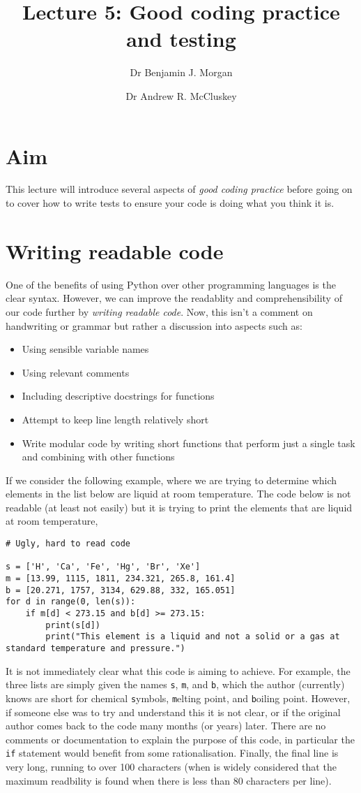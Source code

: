 \documentclass[a4paper]{article}
\title{Lecture 5: Good coding practice and testing}
\author[1]{Dr Benjamin J. Morgan}
\author[1,2]{Dr Andrew R. McCluskey}
\affil[1]{Department of Chemistry, University of Bath, email: b.j.morgan@bath.ac.uk}
\affil[2]{Diamond Light Source, email: andrew.mccluskey@diamond.ac.uk}
\begin{document}
\maketitle

\section*{Aim}
This lecture will introduce several aspects of \emph{good coding practice} before going on to cover how to write tests to ensure your code is doing what you think it is.

\section{Writing readable code}
One of the benefits of using Python over other programming languages is the clear syntax.
However, we can improve the readablity and comprehensibility of our code further by \emph{writing readable code}.
Now, this isn't a comment on handwriting or grammar but rather a discussion into aspects such as:
\begin{itemize}
  \item{Using sensible variable names}
  \item{Using relevant comments}
  \item{Including descriptive docstrings for functions}
  \item{Attempt to keep line length relatively short}
  \item{Write modular code by writing short functions that perform just a single task and combining with other functions}
\end{itemize}
If we consider the following example, where we are trying to determine which elements in the list below are liquid at room temperature.
The code below is not readable (at least not easily) but it is trying to print the elements that are liquid at room temperature,
\begin{lstlisting}
# Ugly, hard to read code

s = ['H', 'Ca', 'Fe', 'Hg', 'Br', 'Xe']
m = [13.99, 1115, 1811, 234.321, 265.8, 161.4]
b = [20.271, 1757, 3134, 629.88, 332, 165.051]
for d in range(0, len(s)):
    if m[d] < 273.15 and b[d] >= 273.15:
        print(s[d])
        print("This element is a liquid and not a solid or a gas at standard temperature and pressure.")
\end{lstlisting}
It is not immediately clear what this code is aiming to achieve.
For example, the three lists are simply given the names \texttt{s}, \texttt{m}, and \texttt{b}, which the author (currently) knows are short for chemical \texttt{s}ymbols, \texttt{m}elting point, and \texttt{b}oiling point.
However, if someone else was to try and understand this it is not clear, or if the original author comes back to the code many months (or years) later.
There are no comments or documentation to explain the purpose of this code, in particular the \texttt{if} statement would benefit from some rationalisation.
Finally, the final line is very long, running to over 100 characters (when is widely considered that the maximum readbility is found when there is less than 80 characters per line).
\end{document}
